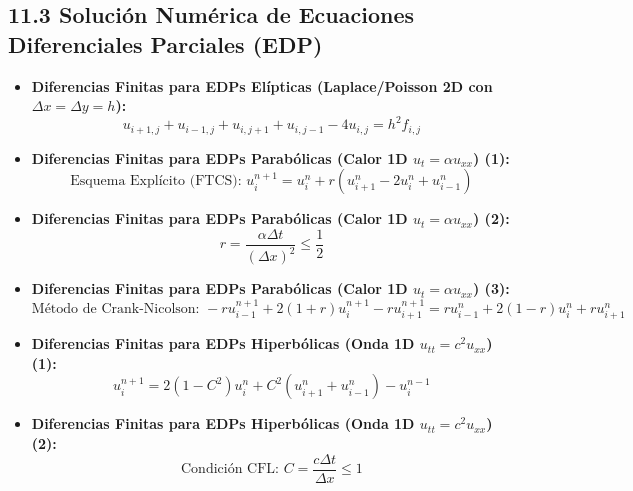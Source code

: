 \documentclass[11pt,a4paper]{article}
\begin{document}
\subsection*{11.3 Solución Numérica de Ecuaciones Diferenciales Parciales (EDP)}

\begin{itemize}
  \item \textbf{Diferencias Finitas para EDPs Elípticas (Laplace/Poisson 2D con $\Delta x = \Delta y = h$):}
  \[
    u_{i+1, j} + u_{i-1, j} + u_{i, j+1} + u_{i, j-1} - 4u_{i, j} = h^2 f_{i, j}
  \]
  \item \textbf{Diferencias Finitas para EDPs Parabólicas (Calor 1D $u_t = \alpha u_{xx}$) (1):}
  \[
    \text{Esquema Explícito (FTCS): } u_i^{n+1} = u_i^n + r(u_{i+1}^n - 2u_i^n + u_{i-1}^n)
  \]
  \item \textbf{Diferencias Finitas para EDPs Parabólicas (Calor 1D $u_t = \alpha u_{xx}$) (2):}
  \[
    r = \frac{\alpha \Delta t}{(\Delta x)^2} \le \frac{1}{2}
  \]
  \item \textbf{Diferencias Finitas para EDPs Parabólicas (Calor 1D $u_t = \alpha u_{xx}$) (3):}
  \[
    \text{Método de Crank-Nicolson: } -r u_{i-1}^{n+1} + 2(1 + r)u_i^{n+1} - r u_{i+1}^{n+1} = r u_{i-1}^n + 2(1 - r)u_i^n + r u_{i+1}^n
  \]
  \item \textbf{Diferencias Finitas para EDPs Hiperbólicas (Onda 1D $u_{tt} = c^2 u_{xx}$) (1):}
  \[
    u_i^{n+1} = 2(1 - C^2)u_i^n + C^2(u_{i+1}^n + u_{i-1}^n) - u_i^{n-1}
  \]
  \item \textbf{Diferencias Finitas para EDPs Hiperbólicas (Onda 1D $u_{tt} = c^2 u_{xx}$) (2):}
  \[
    \text{Condición CFL: } C = \frac{c \Delta t}{\Delta x} \le 1
  \]
\end{itemize}
\end{document}
